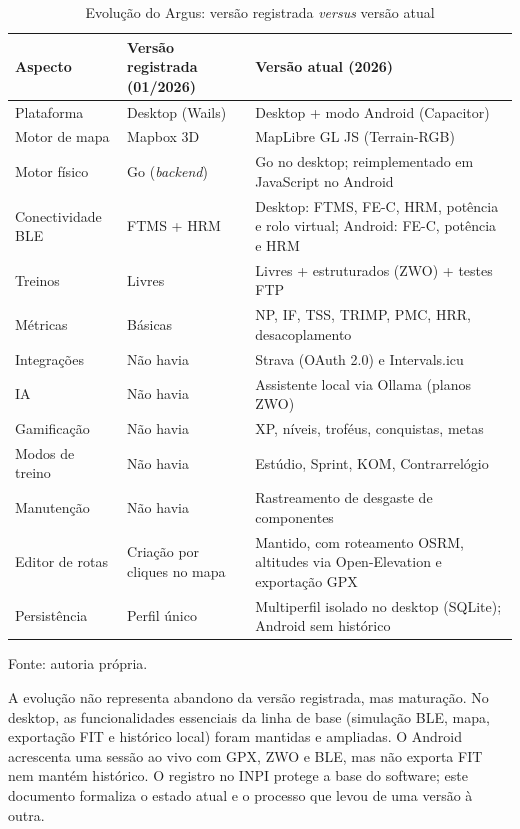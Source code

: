 \begin{table}[htbp]
    \centering
    \caption{Evolução do Argus: versão registrada \textit{versus} versão atual}
    \label{tab:evolucao}
    \small
    \begin{tabular}{
        >{\raggedright\arraybackslash}p{3.2cm}
        >{\raggedright\arraybackslash}p{5.6cm}
        >{\raggedright\arraybackslash}p{5.6cm}
    }
        \toprule
        \textbf{Aspecto} & \textbf{Versão registrada (01/2026)} &
        \textbf{Versão atual (2026)} \\
        \midrule
        Plataforma & Desktop (Wails) & Desktop + modo Android (Capacitor) \\
        Motor de mapa & Mapbox 3D & MapLibre GL JS (Terrain-RGB) \\
        Motor físico & Go (\textit{backend}) & Go no desktop; reimplementado em JavaScript no Android \\
        Conectividade BLE & FTMS + HRM & Desktop: FTMS, FE-C, HRM, potência e rolo virtual; Android: FE-C, potência e HRM \\
        Treinos & Livres & Livres + estruturados (ZWO) + testes FTP \\
        Métricas & Básicas & NP, IF, TSS, TRIMP, PMC, HRR, desacoplamento \\
        Integrações & Não havia & Strava (OAuth 2.0) e Intervals.icu \\
        IA & Não havia & Assistente local via Ollama (planos ZWO) \\
        Gamificação & Não havia & XP, níveis, troféus, conquistas, metas \\
        Modos de treino & Não havia & Estúdio, Sprint, KOM, Contrarrelógio \\
        Manutenção & Não havia & Rastreamento de desgaste de componentes \\
        Editor de rotas & Criação por cliques no mapa & Mantido, com roteamento
        OSRM, altitudes via Open-Elevation e exportação GPX \\
        Persistência & Perfil único & Multiperfil isolado no desktop (SQLite); Android sem histórico \\
        \bottomrule
    \end{tabular}
    \vspace{0.2cm}
    \par\small Fonte: autoria própria.
\end{table}

A evolução não representa abandono da versão registrada, mas maturação. No
desktop, as funcionalidades essenciais da linha de base (simulação BLE, mapa,
exportação FIT e histórico local) foram mantidas e ampliadas. O Android
acrescenta uma sessão ao vivo com GPX, ZWO e BLE, mas não exporta FIT nem mantém
histórico. O registro no INPI protege a base do software; este documento
formaliza o estado atual e o processo que levou de uma versão à outra.

